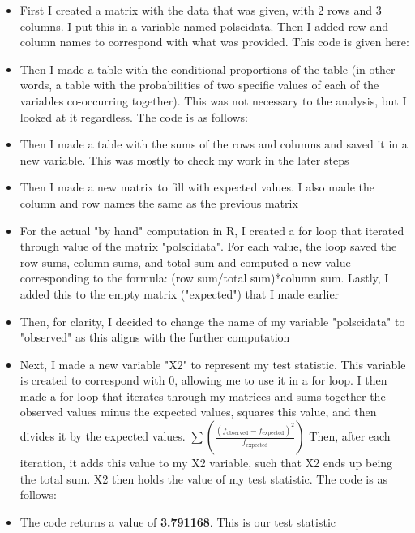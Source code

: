 \documentclass[12pt,letterpaper]{article}
\begin{document}
\begin{enumerate}
		\begin{itemize}
			\item First I created a matrix with the data that was given, with 2 rows and 3 columns. I put this in a variable named polscidata. Then I added row and column names to correspond with what was provided. This code is given here:
				  
			\item Then I made a table with the conditional proportions of the table (in other words, a table with the probabilities of two specific values of each of the variables co-occurring together). This was not necessary to the analysis, but I looked at it regardless. The code is as follows:
				
			\item Then I made a table with the sums of the rows and columns and saved it in a new variable. This was mostly to check my work in the later steps
				
			\item Then I made a new matrix to fill with expected values. I also made the column and row names the same as the previous matrix
				
			\item For the actual "by hand" computation in R, I created a for loop that iterated through value of the matrix "polscidata". For each value, the loop saved the row sums, column sums, and total sum and computed a new value corresponding to the formula: (row sum/total sum)*column sum. Lastly, I added this to the empty matrix ("expected") that I made earlier
				
			\item Then, for clarity, I decided to change the name of my variable "polscidata" to "observed" as this aligns with the further computation
				
			\item Next, I made a new variable "X2" to represent my test statistic. This variable is created to correspond with 0, allowing me to use it in a for loop. I then made a for loop that iterates through my matrices and sums together the observed values minus the expected values, squares this value, and then divides it by the expected values. $\sum \left(\frac{(f_{\text{observed}} - f_{\text{expected}})^2}{f_{\text{expected}}}\right)
			$ Then, after each iteration, it adds this value to my X2 variable, such that X2 ends up being the total sum. X2 then holds the value of my test statistic. The code is as follows:
				
			\item The code returns a value of \textbf{3.791168}. This is our test statistic
		\end{itemize}
	

\end{enumerate}
\end{document}
